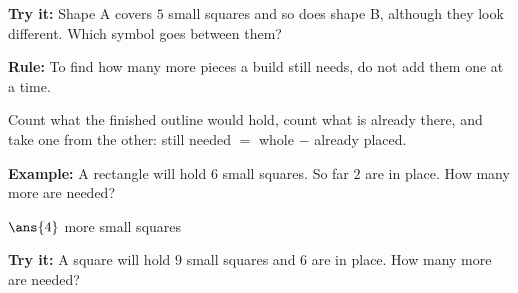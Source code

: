 \documentclass[12pt]{article}
\begin{document}
\begin{tryitbox}
\textbf{Try it:} \quad Shape A covers $5$ small squares and so does shape B, although they look different. Which symbol goes between them?\\[2pt]
\end{tryitbox}


\begin{formulabox}
\textbf{Rule:} To find how many more pieces a build still needs, do not add them one at a time.\par
Count what the finished outline would hold, count what is already there, and take one from the other: \quad still needed $=$ whole $-$ already placed.
\end{formulabox}

\begin{examplebox}
\textbf{Example:} \quad A rectangle will hold $6$ small squares. So far $2$ are in place. How many more are needed?

$\ans{4}$ more small squares
\end{examplebox}

\begin{tryitbox}
\textbf{Try it:} \quad A square will hold $9$ small squares and $6$ are in place. How many more are needed?\\[2pt]
\end{tryitbox}
\end{document}
